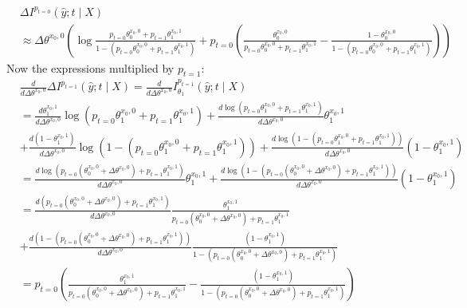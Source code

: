 \documentclass[oneside,12pt]{article}
\begin{document}
\begin{equation*}
    \begin{split}
    &\Delta I^{p_{t=0}}(\hat{y};t \mid X) \\
    &\approx \Delta\theta^{x_0,0}\left(\operatorname{log}\frac{p_{t=0}\theta_0^{x_0,0}+p_{t=1}\theta_1^{x_0,1}}{1-(p_{t=0}\theta_0^{x_0,0}+p_{t=1}\theta_1^{x_0,1})}+ p_{t=0}\left(
        \frac{\theta_0^{x_0,0}}{p_{t=0}\theta_0^{x_0,0}+p_{t=1}\theta_1^{x_0,1}} - \frac{1-\theta_0^{x_0,0}}{1-(p_{t=0}\theta_0^{x_0,0}+p_{t=1}\theta_1^{x_0,1})}\right)\right)
        \end{split}
\end{equation*}
%
Now the expressions multiplied by $p_{t=1}$:
\begin{equation*}
    \begin{split}
        &\frac{d}{d\Delta\theta^{x_0,0}}\Delta I^{p_{t=1}}(\hat{y};t \mid X) = \frac{d}{d\Delta\theta^{x_0,0}} I^{p_{t=1}}_{\theta_1}(\hat{y};t \mid X)\\
        &= \frac{d\theta_1^{x_0,1}}{d\Delta\theta^{x_0,0}} \operatorname{log}(p_{t=0}\theta_1^{x_0,0}+p_{t=1}\theta_1^{x_0,1}) + \frac{d\operatorname{log}(p_{t=0}\theta_1^{x_0,0}+p_{t=1}\theta_1^{x_0,1})}{d\Delta\theta^{x_0,0}}\theta_1^{x_0,1}\\
        &+ \frac{d(1-\theta_1^{x_0,1})}{d\Delta\theta^{x_0,0}} \operatorname{log}(1-(p_{t=0}\theta_1^{x_0,0}+p_{t=1}\theta_1^{x_0,1})) + \frac{d\operatorname{log}(1-(p_{t=0}\theta_1^{x_0,0}+p_{t=1}\theta_1^{x_0,1}))}{d\Delta\theta^{x_0,0}}(1-\theta_1^{x_0,1})\\
        &= \frac{d\operatorname{log}(p_{t=0}(\theta_0^{x_0,0} + \Delta\theta^{x_0,0})+p_{t=1}\theta_1^{x_0,1})}{d\Delta\theta^{x_0,0}}\theta_1^{x_0,1} + \frac{d\operatorname{log}(1-(p_{t=0}(\theta_0^{x_0,0} + \Delta\theta^{x_0,0})+p_{t=1}\theta_1^{x_0,1}))}{d\Delta\theta^{x_0,0}}(1-\theta_1^{x_0,1})\\
        &= \frac{d(p_{t=0}(\theta_0^{x_0,0} + \Delta\theta^{x_0,0})+p_{t=1}\theta_1^{x_0,1})}{d\Delta\theta^{x_0,0}}\frac{\theta_1^{x_0,1}}{p_{t=0}(\theta_0^{x_0,0} + \Delta\theta^{x_0,0})+p_{t=1}\theta_1^{x_0,1}}\\
        &+ \frac{d(1-(p_{t=0}(\theta_0^{x_0,0} + \Delta\theta^{x_0,0})+p_{t=1}\theta_1^{x_0,1}))}{d\Delta\theta^{x_0,0}}\frac{(1-\theta_1^{x_0,1})}{1-(p_{t=0}(\theta_0^{x_0,0} + \Delta\theta^{x_0,0})+p_{t=1}\theta_1^{x_0,1})}\\
        &= p_{t=0}\left(\frac{\theta_1^{x_0,1}}{p_{t=0}(\theta_0^{x_0,0} + \Delta\theta^{x_0,0})+p_{t=1}\theta_1^{x_0,1}}-\frac{(1-\theta_1^{x_0,1})}{1-(p_{t=0}(\theta_0^{x_0,0} + \Delta\theta^{x_0,0})+p_{t=1}\theta_1^{x_0,1})}\right)
    \end{split}
\end{equation*}
\end{document}
